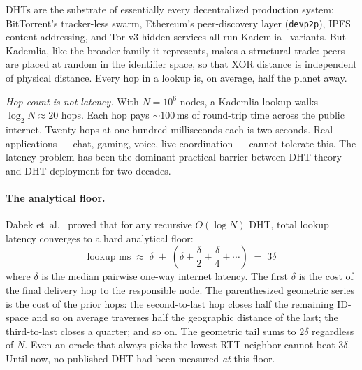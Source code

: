 \documentclass[conference]{IEEEtran}
\begin{document}
DHTs are the substrate of essentially every decentralized
production system: BitTorrent's tracker-less swarm, Ethereum's
peer-discovery layer (\texttt{devp2p}), IPFS content addressing,
and Tor v3 hidden services all run Kademlia~\cite{maymounkov2002kademlia}
variants.  But Kademlia, like the broader family it represents,
makes a structural trade: peers are placed at random in the
identifier space, so that XOR distance is independent of physical
distance.  Every hop in a lookup is, on average, half the planet
away.

\emph{Hop count is not latency.}  With $N = 10^6$ nodes, a
Kademlia lookup walks $\log_2 N \approx 20$ hops.  Each hop pays
$\sim\!100$\,ms of round-trip time across the public internet.
Twenty hops at one hundred milliseconds each is two seconds.  Real
applications --- chat, gaming, voice, live coordination --- cannot
tolerate this.  The latency problem has been the dominant
practical barrier between DHT theory and DHT deployment for two
decades.

\paragraph{The analytical floor.}
Dabek et~al.~\cite{dabek2004designing} proved that for any
recursive $O(\log N)$ DHT, total lookup latency converges to a
hard analytical floor:
\begin{equation}
\text{lookup ms} \;\approx\; \delta \;+\;
\left(\delta + \frac{\delta}{2} + \frac{\delta}{4} + \cdots\right)
\;=\; 3\delta
\label{eq:dabek}
\end{equation}
where $\delta$ is the median pairwise one-way internet latency.
The first $\delta$ is the cost of the final delivery hop to the
responsible node.  The parenthesized geometric series is the cost
of the prior hops: the second-to-last hop closes half the
remaining ID-space and so on average traverses half the
geographic distance of the last; the third-to-last closes a
quarter; and so on.  The geometric tail sums to $2\delta$
regardless of $N$.  Even an oracle that always picks the
lowest-RTT neighbor cannot beat $3\delta$.  Until now, no
published DHT had been measured \emph{at} this floor.
\end{document}
